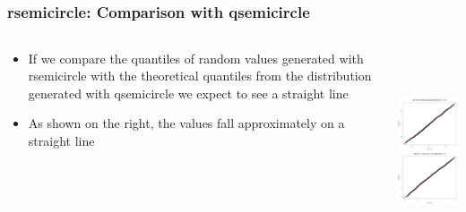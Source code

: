 \documentclass[handout, xcolor=dvipsnames]{beamer}
\begin{document}
\subsection{}
\begin{frame}
	\frametitle{rsemicircle: Comparison with qsemicircle}
            \begin{columns}[T]
                \begin{column}{.5\textwidth}
            	\begin{itemize}
                	\item If we compare the quantiles of random values generated with rsemicircle with the theoretical quantiles from the distribution generated with qsemicircle we expect to see a straight line
                    \item As shown on the right, the values fall approximately on a straight line
                    \end{itemize}
                \end{column}
                \begin{column}{.5\textwidth}
                    \includegraphics[width=5cm,height=6cm]{Figures/rsemicircle-qq.png}
                \end{column}
            \end{columns}
\end{frame}
\end{document}
